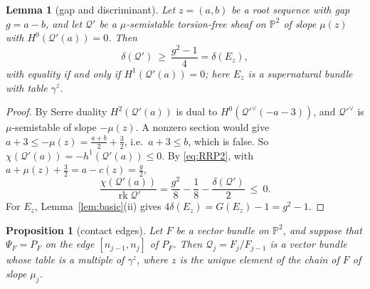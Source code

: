 \documentclass[11pt]{amsart}
\newtheorem{proposition}[theorem]{Proposition}
\newtheorem{lemma}[theorem]{Lemma}
\theoremstyle{definition}
\theoremstyle{remark}
\newcommand{\PP}{\mathbb{P}}
\newcommand{\cQ}{\mathcal{Q}}
\DeclareMathOperator{\rk}{rk}
\begin{document}
\begin{lemma}[gap and discriminant]\label{lem:gapdisc}
Let $z=(a,b)$ be a root sequence with gap $g=a-b$, and let $\cQ'$ be a $\mu$-semistable torsion-free sheaf on $\PP^2$ of slope $\mu(z)$ with $H^0(\cQ'(a))=0$. Then
\[
\delta(\cQ')\ \ge\ \frac{g^2-1}4=\delta(E_z),
\]
with equality if and only if $H^1(\cQ'(a))=0$; here $E_z$ is a supernatural bundle with table $\gamma^z$.
\end{lemma}

\begin{proof}
By Serre duality $H^2(\cQ'(a))$ is dual to $H^0(\cQ'^\vee(-a-3))$, and $\cQ'^\vee$ is $\mu$-semistable of slope $-\mu(z)$. A nonzero section would give $a+3\le-\mu(z)=\frac{a+b}2+\frac32$, i.e.\ $a+3\le b$, which is false. So $\chi(\cQ'(a))=-h^1(\cQ'(a))\le0$. By \eqref{eq:RRP2}, with $a+\mu(z)+\frac32=a-c(z)=\frac g2$,
\[
\frac{\chi(\cQ'(a))}{\rk\cQ'}=\frac{g^2}8-\frac18-\frac{\delta(\cQ')}2\ \le\ 0 .
\]
For $E_z$, Lemma~\ref{lem:basic}(ii) gives $4\delta(E_z)=G(E_z)-1=g^2-1$.
\end{proof}

\begin{proposition}[contact edges]\label{prop:contactedge}
Let $F$ be a vector bundle on $\PP^2$, and suppose that $\Psi_F=P_F$ on the edge $[n_{j-1},n_j]$ of $P_F$. Then $\cQ_j=F_j/F_{j-1}$ is a vector bundle whose table is a multiple of $\gamma^z$, where $z$ is the unique element of the chain of $F$ of slope $\mu_j$.
\end{proposition}
\end{document}
